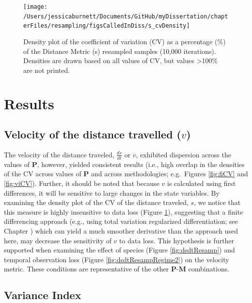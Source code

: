 \documentclass[12pt,twoside,openany]{reedthesis}
\begin{document}
\begin{figure}
\texttt{[image: /Users/jessicaburnett/Documents/GitHub/myDissertation/chapterFiles/resampling/figsCalledInDiss/s\_cvDensity]} \caption{Density plot of the coefficient of variation (CV) as a percentage (\%) of the Distance Metric (s) resampled samples (10,000 iterations). Densities are drawn based on all values of CV, but values \textgreater100\% are not printed.}\label{fig:sCV}
\end{figure}
\hypertarget{results-2}{%
\section{Results}\label{results-2}}

\hypertarget{velocity-of-the-distance-travelled-v}{%
\subsection{\texorpdfstring{Velocity of the distance travelled (\(v\))}{Velocity of the distance travelled (v)}}\label{velocity-of-the-distance-travelled-v}}

The velocity of the distance traveled, \(\frac{ds}{dt}\) or \(v\), exhibited dispersion across the values of \(\textbf{P}\), however, yielded consistent results (i.e., high overlap in the densities of the CV across values of \(\textbf{P}\) and across methodologies; e.g.~Figures \ref{fig:fiCV} and \ref{fig:viCV}). Further, it should be noted that because \(v\) is calculated using first differences, it will be sensitive to large changes in the state variables. By examining the density plot of the CV of the distance traveled, \(s\), we notice that this measure is highly insensitive to data loss (Figure \ref{fig:sCV}), suggesting that a finite differencing approach (e.g., using total variation regularized differentiation; see Chapter ) which can yield a much smoother derivative than the approach used here, may decrease the sensitivity of \(v\) to data loss. This hypothesis is further supported when examining the effect of species (Figure \ref{fig:dsdtResamp}) and temporal observation loss (Figure \ref{fig:dsdtResampRegime2}) on the velocity metric. These conditions are representative of the other \(\textbf{P}\)-\(\textbf{M}\) combinations.

\hypertarget{variance-index}{%
\subsection{Variance Index}\label{variance-index}}
\end{document}
